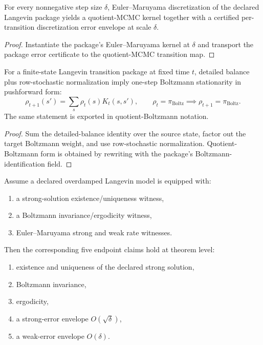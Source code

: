\begin{theorem}\label{thm:langevin-discretization-certified}
For every nonnegative step size $\delta$, Euler--Maruyama discretization of the declared Langevin package yields a quotient-MCMC kernel together with a certified per-transition discretization error envelope at scale $\delta$.
\end{theorem}

\begin{proof}
Instantiate the package's Euler--Maruyama kernel at $\delta$ and transport the package error certificate to the quotient-MCMC transition map.
\end{proof}

\begin{theorem}\label{thm:langevin-boltzmann-stationarity-measure-derivation}
For a finite-state Langevin transition package at fixed time $t$, detailed balance plus row-stochastic normalization imply one-step Boltzmann stationarity in pushforward form:
\[
\rho_{t+1}(s') = \sum_s \rho_t(s)K_t(s,s'),\qquad
\rho_t=\pi_{\mathrm{Boltz}} \implies \rho_{t+1}=\pi_{\mathrm{Boltz}}.
\]
The same statement is exported in quotient-Boltzmann notation.
\end{theorem}

\begin{proof}
Sum the detailed-balance identity over the source state, factor out the target Boltzmann weight, and use row-stochastic normalization. Quotient-Boltzmann form is obtained by rewriting with the package's Boltzmann-identification field.
\end{proof}

\begin{theorem}\label{thm:langevin-analysis-closure-endpoint-bundle}
Assume a declared overdamped Langevin model is equipped with:
\begin{enumerate}
\item a strong-solution existence/uniqueness witness,
\item a Boltzmann invariance/ergodicity witness,
\item Euler--Maruyama strong and weak rate witnesses.
\end{enumerate}
Then the corresponding five endpoint claims hold at theorem level:
\begin{enumerate}
\item existence and uniqueness of the declared strong solution,
\item Boltzmann invariance,
\item ergodicity,
\item a strong-error envelope $O(\sqrt{\delta})$,
\item a weak-error envelope $O(\delta)$.
\end{enumerate}
\end{theorem}

